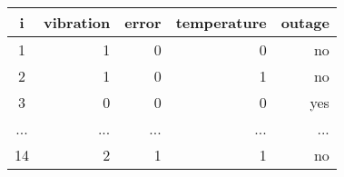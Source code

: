 \begin{tabular}{crrrr}
\toprule
   i & vibration & error & temperature & outage \\
\midrule
   1 &         1 &     0 &           0 &     no \\
   2 &         1 &     0 &           1 &     no \\
   3 &         0 &     0 &           0 &    yes \\
 ... &       ... &   ... &         ... &    ... \\
  14 &         2 &     1 &           1 &     no \\
\bottomrule
\end{tabular}
